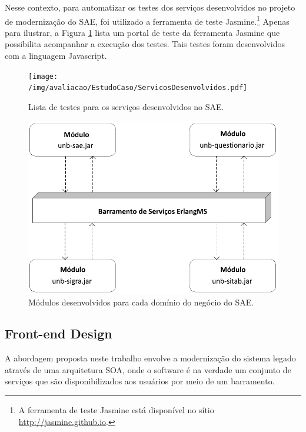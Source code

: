 Nesse contexto, 
para automatizar os testes
dos serviços 
desenvolvidos no 
projeto de modernização do \acrshort{SAE}, 
foi utilizado a ferramenta
de teste Jasmine.\footnote{A ferramenta de teste Jasmine está disponível
no sítio \url{http://jasmine.github.io}.} 
Apenas para ilustrar, a Figura \ref{fig:servicos_desenvolvidos}
lista um portal de teste da 
ferramenta Jasmine que possibilita
acompanhar a execução dos testes. Tais testes foram 
desenvolvidos com a linguagem Javascript.

\begin{figure}[htb]
\centering
\texttt{[image: /img/avaliacao/EstudoCaso/ServicosDesenvolvidos.pdf]}
\caption{Lista de testes para os serviços desenvolvidos no SAE.}
\label{fig:servicos_desenvolvidos}
\end{figure}

\FloatBarrier

\begin{figure}[htb]
\centering
\includegraphics[scale=0.57]{img/processo/modulos_sae.pdf}
\caption{Módulos desenvolvidos para cada domínio do negócio do \acrshort{SAE}.}
\label{fig:modulos_sae}
\end{figure}

\FloatBarrier



\subsection{Front-end Design}

A abordagem proposta neste trabalho
envolve a modernização do sistema legado
através de uma arquitetura \acrshort{SOA},
onde o software é na verdade
um conjunto de serviços que 
são disponibilizados aos usuários
por meio de um barramento.

